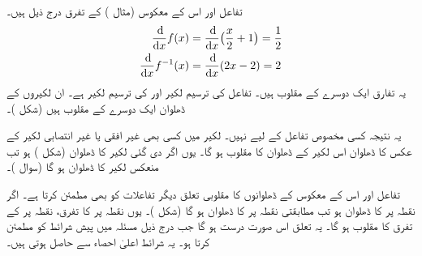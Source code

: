 تفاعل   اور اس کے معکوس  (مثال ) کے تفرق درج ذیل ہیں۔
\begin{align*}
\frac{\dif}{\dif x}f(x)&=\frac{\dif}{\dif x}\big(\frac{x}{2}+1\big)=\frac{1}{2}\\
\frac{\dif}{\dif x}f^{-1}(x)&=\frac{\dif}{\dif x}(2x-2)=2
\end{align*}
یہ تفارق ایک دوسرے کے مقلوب  ہیں۔ تفاعل  کی ترسیم لکیر  اور  کی ترسیم لکیر  ہے۔ ان لکیروں کے ڈھلوان ایک دوسرے کے  مقلوب  ہیں (شکل )۔

یہ نتیجہ کسی مخصوص تفاعل کے لیے نہیں۔ لکیر  میں کسی بھی غیر افقی یا غیر انتصابی لکیر کے عکس کا ڈھلوان اس لکیر کے ڈھلوان کا  مقلوب ہو گا۔ یوں اگر دی گئی  لکیر کا ڈھلوان  (شکل ) ہو تب منعکس لکیر کا ڈھلوان  ہو گا (سوال )۔ 

تفاعل اور اس کے معکوس کے ڈھلوانوں   کا مقلوبی  تعلق دیگر تفاعلات  کو بھی مطمئن کرتا ہے۔ اگر نقطہ  پر  کا ڈھلوان  ہو تب مطابقتی نقطہ  پر  کا ڈھلوان  ہو گا (شکل )۔ یوں نقطہ  پر  کا تفرق، نقطہ  پر  کے تفرق کا   مقلوب  ہو گا۔ یہ تعلق اس صورت درست ہو گا جب  درج ذیل مسئلہ میں پیش   شرائط کو مطمئن کرتا ہو۔ یہ شرائط اعلیٰ احصاء سے حاصل ہوتی ہیں۔ 

